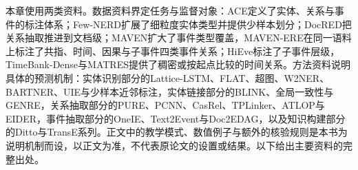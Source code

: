 本章使用两类资料。数据资料界定任务与监督对象：ACE定义了实体、关系与事件的标注体系；Few-NERD扩展了细粒度实体类型并提供少样本划分；DocRED把关系抽取推进到文档级；MAVEN扩大了事件类型覆盖，MAVEN-ERE在同一语料上标注了共指、时间、因果与子事件四类事件关系；HiEve标注了子事件层级，TimeBank-Dense与MATRES提供了稠密或按起点比较的时间关系。方法资料说明具体的预测机制：实体识别部分的Lattice-LSTM、FLAT、超图、W2NER、BARTNER、UIE与少样本近邻标注，实体链接部分的BLINK、全局一致性与GENRE，关系抽取部分的PURE、PCNN、CasRel、TPLinker、ATLOP与EIDER，事件抽取部分的OneIE、Text2Event与Doc2EDAG，以及知识构建部分的Ditto与TransE系列。正文中的教学模式、数值例子与额外的核验规则是本书为说明机制而设，以正文为准，不代表原论文的设置或结果。以下给出主要资料的完整出处。
\begin{fullwidth}
  \small
  \noindent{}\par\medskip
  \noindent{}\par\medskip
  \noindent{}\par\medskip
  \noindent{}\par\medskip
  \noindent{}\par\medskip
  \noindent{}\par\medskip
  \noindent{}\par\medskip
  \noindent{}\par\medskip
  \noindent{}\par\medskip
  \noindent{}\par\medskip
  \noindent{}\par\medskip
  \noindent{}\par\medskip
  \noindent{}\par\medskip
  \noindent{}\par\medskip
  \noindent{}\par\medskip
  \noindent{}\par\medskip
  \noindent{}\par\medskip
  \noindent{}\par\medskip
  \noindent{}\par\medskip
  \noindent{}\par\medskip
  \noindent{}\par\medskip

\end{fullwidth}
